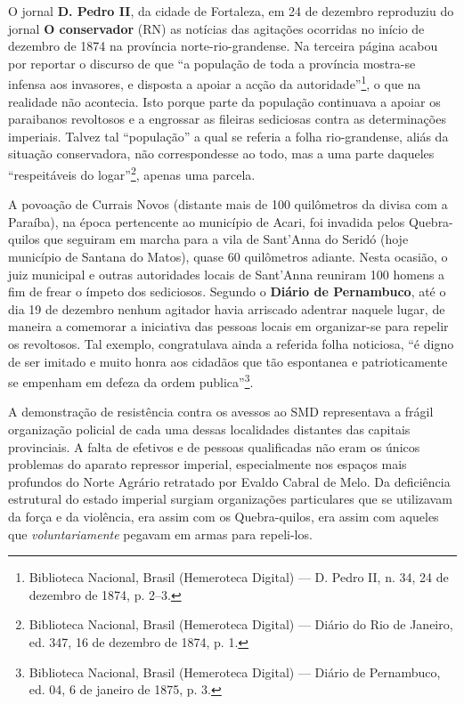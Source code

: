 \begin{refsection}
O jornal \textbf{D. Pedro II}, da cidade de Fortaleza, em 24 de dezembro reproduziu do jornal \textbf{O conservador} (RN) as notícias das agitações ocorridas no início de dezembro de 1874 na província norte-rio-grandense. Na terceira página acabou por reportar o discurso de que “a população de toda a província mostra-se infensa aos invasores, e disposta a apoiar a acção da autoridade”\footnote{Biblioteca Nacional, Brasil (Hemeroteca Digital) --- D. Pedro II, n. 34, 24 de dezembro de 1874, p. 2--3.}, o que na realidade não acontecia. Isto porque parte da população continuava a apoiar os paraibanos revoltosos e a engrossar as fileiras sediciosas contra as determinações imperiais. Talvez tal “população” a qual se referia a folha rio-grandense, aliás da situação conservadora, não correspondesse ao todo, mas a uma parte daqueles “respeitáveis do logar”\footnote{Biblioteca Nacional, Brasil (Hemeroteca Digital) --- Diário do Rio de Janeiro, ed. 347, 16 de dezembro de 1874, p. 1.}, apenas uma parcela.  

A povoação de Currais Novos (distante mais de 100 quilômetros da divisa com a Paraíba), na época pertencente ao município de Acari, foi invadida pelos Quebra-quilos que seguiram em marcha para a vila de Sant’Anna do Seridó (hoje município de Santana do Matos), quase 60 quilômetros adiante. Nesta ocasião, o juiz municipal e outras autoridades locais de Sant’Anna reuniram 100 homens a fim de frear o ímpeto dos sediciosos. Segundo o \textbf{Diário de Pernambuco}, até o dia 19 de dezembro nenhum agitador havia arriscado adentrar naquele lugar, de maneira a comemorar a iniciativa das pessoas locais em organizar-se para repelir os revoltosos. Tal exemplo, congratulava ainda a referida folha noticiosa, “é digno de ser imitado e muito honra aos cidadãos que tão espontanea e patrioticamente se empenham em defeza da ordem publica”\footnote{Biblioteca Nacional, Brasil (Hemeroteca Digital) --- Diário de Pernambuco, ed. 04, 6 de janeiro de 1875, p. 3.}.

A demonstração de resistência contra os avessos ao SMD representava a frágil organização policial de cada uma dessas localidades distantes das capitais provinciais. A falta de efetivos e de pessoas qualificadas não eram os únicos problemas do aparato repressor imperial, especialmente nos espaços mais profundos do Norte Agrário retratado por Evaldo Cabral de Melo. Da deficiência estrutural do estado imperial surgiam organizações particulares que se utilizavam da força e da violência, era assim com os Quebra-quilos, era assim com aqueles que \textit{voluntariamente} pegavam em armas para repeli-los.  


\end{refsection}
